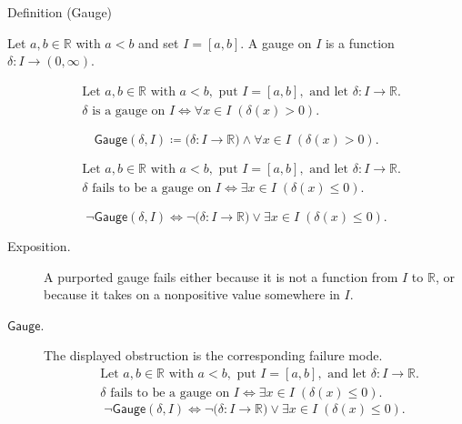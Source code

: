 \begin{definitionbox}{Definition (Gauge)}
\begin{definition}[Gauge]
\label{def:gauge}
Let $a,b \in \mathbb{R}$ with $a<b$ and set $I=[a,b]$. A gauge on $I$ is a function $\delta:I\to(0,\infty)$.
\end{definition}
\end{definitionbox}

\begin{remark*}
\[
\begin{aligned}
&\text{Let } a,b\in\mathbb{R} \text{ with } a<b, \text{ put } I=[a,b], \text{ and let } \delta:I\to\mathbb{R}.\\
&\delta \text{ is a gauge on } I \Longleftrightarrow \forall x\in I\;(\delta(x)>0).
\end{aligned}
\]
\end{remark*}

\begin{remark*}
\[
\mathsf{Gauge}(\delta,I)
\coloneqq
\bigl(\delta:I\to\mathbb{R}\bigr)
\land
\forall x\in I\;(\delta(x)>0).
\]
\end{remark*}

\begin{remark*}
\[
\begin{aligned}
&\text{Let } a,b\in\mathbb{R} \text{ with } a<b, \text{ put } I=[a,b], \text{ and let } \delta:I\to\mathbb{R}.\\
&\delta \text{ fails to be a gauge on } I \Longleftrightarrow \exists x\in I\;(\delta(x)\le 0).
\end{aligned}
\]
\end{remark*}

\begin{remark*}
\[
\neg\mathsf{Gauge}(\delta,I)
\Longleftrightarrow
\neg\bigl(\delta:I\to\mathbb{R}\bigr)
\lor
\exists x\in I\;(\delta(x)\le 0).
\]
\end{remark*}

\begin{remark*}
\begin{description}
  \item[Exposition.]
A purported gauge fails either because it is not a function from $I$ to
\(\mathbb{R}\), or because it takes on a nonpositive value somewhere in
$I$.


  \item[\(\mathsf{Gauge}.\)]
  The displayed obstruction is the corresponding failure mode.
  \[
\begin{aligned}
&\text{Let } a,b\in\mathbb{R} \text{ with } a<b, \text{ put } I=[a,b], \text{ and let } \delta:I\to\mathbb{R}.\\
&\delta \text{ fails to be a gauge on } I \Longleftrightarrow \exists x\in I\;(\delta(x)\le 0).
\end{aligned}
  \]
  \[
\neg\mathsf{Gauge}(\delta,I)
\Longleftrightarrow
\neg\bigl(\delta:I\to\mathbb{R}\bigr)
\lor
\exists x\in I\;(\delta(x)\le 0).
  \]
\end{description}
\end{remark*}

